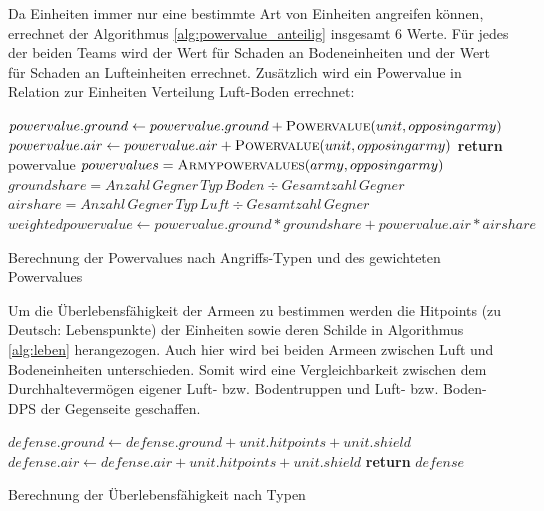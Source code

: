 Da Einheiten immer nur eine bestimmte Art von Einheiten angreifen können, errechnet der Algorithmus \ref{alg:powervalue_anteilig} insgesamt 6 Werte. Für jedes der beiden Teams wird der Wert für Schaden an Bodeneinheiten und der Wert für Schaden an Lufteinheiten errechnet. Zusätzlich wird ein Powervalue in Relation zur Einheiten Verteilung Luft-Boden errechnet:
\begin{algorithm}
\begin{algorithmic}[1]
		\State $powervalue.ground \leftarrow powervalue.ground+\textsc{Powervalue}(unit, opposingarmy)$	
		\Else
			\State $powervalue.air \leftarrow powervalue.air+\textsc{Powervalue}(unit, opposingarmy)$	
		\EndIf	
	\EndFor
{}
\State \textbf{return} powervalue
\EndProcedure	
\State $powervalues = \textsc{Armypowervalues}(army, opposingarmy)$
\State $groundshare = Anzahl\,Gegner\,Typ\,Boden \div Gesamtzahl\,Gegner$
\State $airshare = Anzahl\,Gegner\,Typ\,Luft \div Gesamtzahl\,Gegner$
\State $weightedpowervalue \leftarrow powervalue.ground * groundshare + powervalue.air * airshare$ 
\end{algorithmic}
\caption{Berechnung der Powervalues nach Angriffs-Typen und des gewichteten Powervalues}
\label{alg:powervalue_anteilig}
\end{algorithm}



Um die Überlebensfähigkeit der Armeen zu bestimmen werden die Hitpoints (zu Deutsch: Lebenspunkte) der Einheiten sowie deren Schilde in Algorithmus \ref{alg:leben} herangezogen. Auch hier wird bei beiden Armeen zwischen Luft und Bodeneinheiten unterschieden. Somit wird eine Vergleichbarkeit zwischen dem Durchhaltevermögen eigener Luft- bzw. Bodentruppen und Luft- bzw. Boden-DPS der Gegenseite geschaffen.

\begin{algorithm}
\begin{algorithmic}[1]
			\State $defense.ground \leftarrow defense.ground + unit.hitpoints + unit.shield$
		\EndIf
			\State $defense.air \leftarrow defense.air + unit.hitpoints + unit.shield$
		\EndIf
	\EndFor 
	\State \textbf{return} $defense$
\EndProcedure
\end{algorithmic}
\caption{Berechnung der Überlebensfähigkeit nach Typen}
\label{alg:leben}
\end{algorithm}

